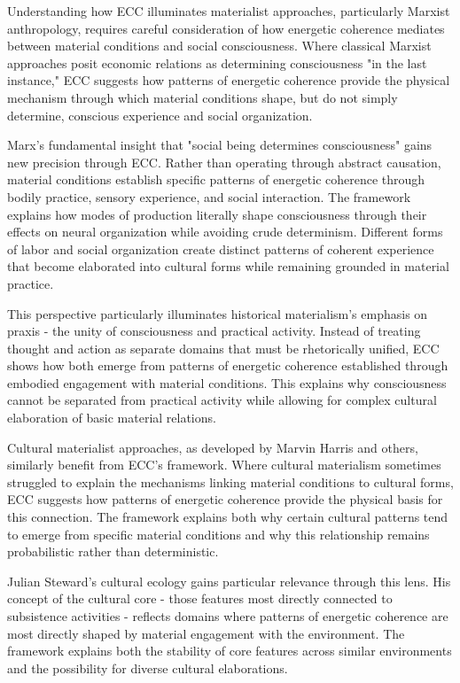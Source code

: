 Understanding how ECC illuminates materialist approaches, particularly Marxist anthropology, requires careful consideration of how energetic coherence mediates between material conditions and social consciousness. Where classical Marxist approaches posit economic relations as determining consciousness "in the last instance," ECC suggests how patterns of energetic coherence provide the physical mechanism through which material conditions shape, but do not simply determine, conscious experience and social organization.

Marx's fundamental insight that "social being determines consciousness" gains new precision through ECC. Rather than operating through abstract causation, material conditions establish specific patterns of energetic coherence through bodily practice, sensory experience, and social interaction. The framework explains how modes of production literally shape consciousness through their effects on neural organization while avoiding crude determinism. Different forms of labor and social organization create distinct patterns of coherent experience that become elaborated into cultural forms while remaining grounded in material practice.

This perspective particularly illuminates historical materialism's emphasis on praxis - the unity of consciousness and practical activity. Instead of treating thought and action as separate domains that must be rhetorically unified, ECC shows how both emerge from patterns of energetic coherence established through embodied engagement with material conditions. This explains why consciousness cannot be separated from practical activity while allowing for complex cultural elaboration of basic material relations.

Cultural materialist approaches, as developed by Marvin Harris and others, similarly benefit from ECC's framework. Where cultural materialism sometimes struggled to explain the mechanisms linking material conditions to cultural forms, ECC suggests how patterns of energetic coherence provide the physical basis for this connection. The framework explains both why certain cultural patterns tend to emerge from specific material conditions and why this relationship remains probabilistic rather than deterministic.

Julian Steward's cultural ecology gains particular relevance through this lens. His concept of the cultural core - those features most directly connected to subsistence activities - reflects domains where patterns of energetic coherence are most directly shaped by material engagement with the environment. The framework explains both the stability of core features across similar environments and the possibility for diverse cultural elaborations.

